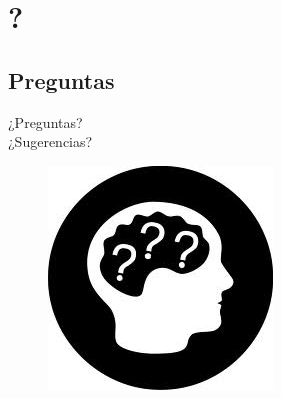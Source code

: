 \documentclass[xcolor=x11names,compress]{beamer}
\renewcommand{\(}{\begin{columns}}
\renewcommand{\)}{\end{columns}}
\newcommand{\<}[1]{\begin{column}{#1}}
\renewcommand{\>}{\end{column}}
\begin{document}
\section{\scshape ?}
\subsection{Preguntas}
\begin{frame}
\centering ¿Preguntas?\\
\centering ¿Sugerencias?\\
\begin{figure}
\centering
\includegraphics[scale=0.5, keepaspectratio=True, natwidth=800,natheight=600]{question.jpeg}
\end{figure}
\end{frame}
\end{document}
